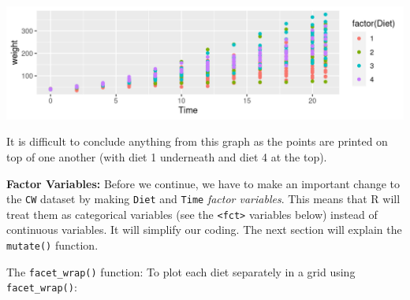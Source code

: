 \documentclass[
  14pt,
]{memoir}
\newenvironment{Shaded}{\begin{snugshade}}{\end{snugshade}}
\newcommand{\AttributeTok}[1]{\textcolor[rgb]{0.77,0.63,0.00}{#1}}
\newcommand{\CommentTok}[1]{\textcolor[rgb]{0.56,0.35,0.01}{\textit{#1}}}
\newcommand{\FunctionTok}[1]{\textcolor[rgb]{0.00,0.00,0.00}{#1}}
\newcommand{\NormalTok}[1]{#1}
\newcommand{\OtherTok}[1]{\textcolor[rgb]{0.56,0.35,0.01}{#1}}
\begin{document}
\begin{center}\includegraphics[width=0.8\linewidth]{figure/minimal-addColourPlot-1} \end{center}

It is difficult to conclude anything from this graph as the points are printed on top of
one another (with diet 1 underneath and diet 4 at the top).

\textbf{Factor Variables:}
Before we continue, we have to make an important change to the \texttt{CW} dataset by making
\texttt{Diet} and \texttt{Time} \emph{factor variables}. This means that R will treat them as categorical
variables (see the \texttt{\textless{}fct\textgreater{}} variables below) instead of continuous variables. It will
simplify our coding. The next section will explain the \texttt{mutate()} function.

\begin{Shaded}
\end{Shaded}

The \texttt{facet\_wrap()} function: To plot each diet separately in a grid using \texttt{facet\_wrap()}:
\end{document}
